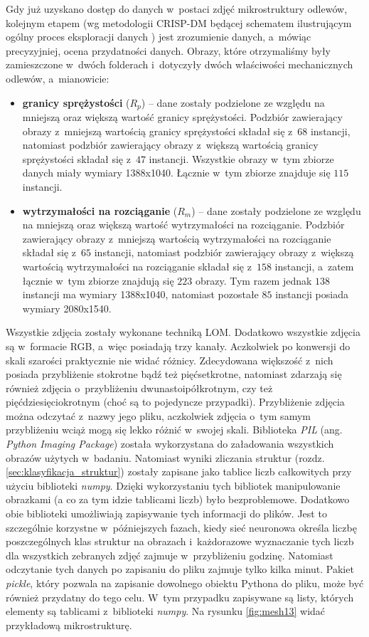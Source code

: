 Gdy już uzyskano dostęp do danych w~postaci zdjęć mikrostruktury odlewów, kolejnym etapem (wg metodologii CRISP-DM będącej schematem ilustrującym ogólny proces eksploracji danych \cite{Watson00}) jest zrozumienie danych, a~mówiąc precyzyjniej, ocena przydatności danych. 
Obrazy, które otrzymaliśmy były zamieszczone w~dwóch folderach i~dotyczyły dwóch właściwości mechanicznych odlewów, a~mianowicie:
\begin{itemize}
	\item \textbf{granicy sprężystości} ($R_p$) – dane zostały podzielone ze względu na mniejszą oraz większą wartość granicy sprężystości. Podzbiór zawierający obrazy z~mniejszą wartością granicy sprężystości składał się z~$68$ instancji, natomiast podzbiór zawierający obrazy z~większą wartością granicy sprężystości składał się z~$47$ instancji. Wszystkie obrazy w~tym zbiorze danych miały wymiary 1388x1040. Łącznie w~tym zbiorze znajduje się $115$ instancji.
	\item \textbf{wytrzymałości na rozciąganie} ($R_{m}$) – dane zostały podzielone ze względu na mniejszą oraz większą wartość wytrzymałości na rozciąganie. Podzbiór zawierający obrazy z~mniejszą wartością wytrzymałości na rozciąganie składał się z~$65$ instancji, natomiast podzbiór zawierający obrazy z~większą wartością wytrzymałości na rozciąganie składał się z~$158$ instancji, a~zatem łącznie w~tym zbiorze znajdują się $223$ obrazy. Tym razem jednak $138$ instancji ma wymiary 1388x1040, natomiast pozostałe $85$ instancji posiada wymiary 2080x1540.
\end{itemize}
Wszystkie zdjęcia zostały wykonane techniką LOM. Dodatkowo wszystkie zdjęcia są w~formacie RGB, a~więc posiadają trzy kanały. Aczkolwiek po konwersji do skali szarości praktycznie nie widać różnicy. Zdecydowana większość z~nich posiada przybliżenie stokrotne bądź też pięćsetkrotne, natomiast zdarzają się również zdjęcia o~przybliżeniu dwunastoipółkrotnym, czy też pięćdziesięciokrotnym (choć są to pojedyncze przypadki). Przybliżenie zdjęcia można odczytać z~nazwy jego pliku, aczkolwiek zdjęcia o~tym samym przybliżeniu wciąż mogą się lekko różnić w~swojej skali. Biblioteka \textit{PIL} (ang. \textit{Python Imaging Package}) została wykorzystana do załadowania wszystkich obrazów użytych w~badaniu. Natomiast wyniki zliczania struktur (rozdz. \ref{sec:klasyfikacja_struktur}) zostały zapisane jako tablice liczb całkowitych przy użyciu biblioteki \textit{numpy}. Dzięki wykorzystaniu tych bibliotek manipulowanie obrazkami (a co za tym idzie tablicami liczb) było bezproblemowe. Dodatkowo obie biblioteki umożliwiają zapisywanie tych informacji do plików. Jest to szczególnie korzystne w~późniejszych fazach, kiedy sieć neuronowa określa liczbę poszczególnych klas struktur na obrazach i~każdorazowe wyznaczanie tych liczb dla wszystkich zebranych zdjęć zajmuje w~przybliżeniu godzinę. Natomiast odczytanie tych danych po zapisaniu do pliku zajmuje tylko kilka minut. Pakiet \textit{pickle}, który pozwala na zapisanie dowolnego obiektu Pythona do pliku, może być również przydatny do tego celu. W~tym przypadku zapisywane są listy, których elementy są tablicami z~biblioteki \textit{numpy}. Na rysunku \ref{fig:mesh13} widać przykładową mikrostrukturę.
